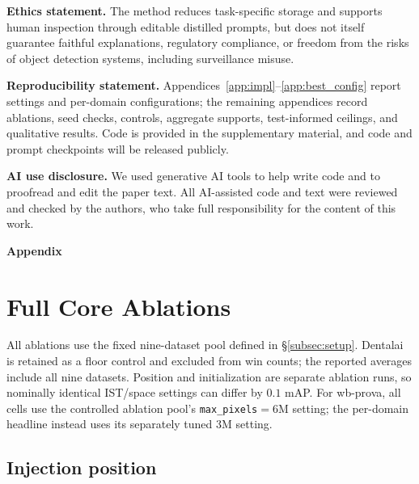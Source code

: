 \documentclass{article}
\begin{document}
\noindent\textbf{Ethics statement.}
The method reduces task-specific storage and supports human inspection through
editable distilled prompts, but does not itself guarantee faithful
explanations, regulatory compliance, or freedom from the risks of object
detection systems, including surveillance misuse.

\noindent\textbf{Reproducibility statement.}
Appendices~\ref{app:impl}--\ref{app:best_config} report settings and per-domain
configurations; the remaining appendices record ablations, seed checks,
controls, aggregate supports, test-informed ceilings, and qualitative results.
Code is provided in the supplementary material, and code and prompt
checkpoints will be released publicly.

\noindent\textbf{AI use disclosure.}
We used generative AI tools to help write code and to proofread and edit the
paper text. All AI-assisted code and text were reviewed and checked by the
authors, who take full responsibility for the content of this work.





\newpage
\appendix
\begin{center}
  {\LARGE\bfseries Appendix}
\end{center}

\section{Full Core Ablations}
\label{app:full_ablations}

All ablations use the fixed nine-dataset pool defined in
\S\ref{subsec:setup}. Dentalai is retained as a floor control and excluded
from win counts; the reported averages include all nine datasets.
Position and initialization are separate ablation runs, so nominally identical
IST/space settings can differ by $0.1$ mAP.
For wb-prova, all cells use the controlled ablation pool's
\texttt{max\_pixels}$=6$M setting; the per-domain headline instead uses its
separately tuned 3M setting.

\subsection{Injection position}
\end{document}
